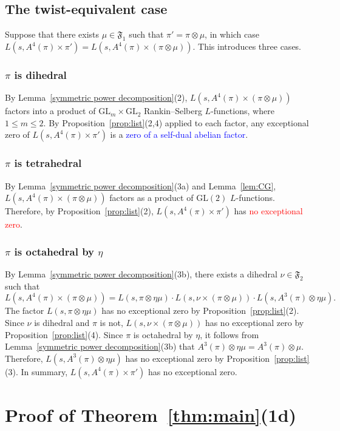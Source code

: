 \documentclass[11pt]{amsart}
\theoremstyle{remark}
\newcommand{\GL}{\mathrm{GL}}
\newcommand{\fF}{\mathfrak{F}}
\numberwithin{equation}{section}
\begin{document}
\subsection{The twist-equivalent case} 
Suppose that there exists $\mu\in\fF_1$ such that $\pi' = \pi \otimes \mu$, in which case $L(s,A^4(\pi) \times \pi') = L(s,A^4(\pi) \times (\pi \otimes \mu))$.  This introduces three cases.
\subsubsection{$\pi$ is dihedral}
By Lemma~\ref{symmetric power decomposition}(2), $L(s,A^4(\pi) \times (\pi \otimes \mu))$ factors into a product of $\GL_m\times \GL_2$ Rankin--Selberg $L$-functions, where $1 \leq m \leq 2$.  By Proposition~\ref{prop:list}(2,4) applied to each factor, any exceptional zero of $L(s,A^4(\pi) \times \pi')$ is a  \textcolor{blue}{zero of a self-dual abelian factor}.
\subsubsection{$\pi$ is tetrahedral}
By Lemma~\ref{symmetric power decomposition}(3a) and Lemma~\ref{lem:CG}, $L(s,A^4(\pi) \times (\pi \otimes \mu))$ factors as a product of $\GL(2)$ $L$-functions.  Therefore, by Proposition~\ref{prop:list}(2), $L(s,A^4(\pi) \times \pi')$ has \textcolor{red}{no exceptional zero}.
\subsubsection{$\pi$ is octahedral by $\eta$}
By Lemma~\ref{symmetric power decomposition}(3b), there exists a dihedral $\nu\in\mathfrak{F}_2$ such that
\[
L(s,A^4(\pi) \times (\pi \otimes \mu)) = L(s,\pi \otimes \eta\mu) \cdot L(s,\nu \times (\pi \otimes \mu)) \cdot L(s,A^3(\pi) \otimes \eta\mu).
\]
The factor $L(s,\pi\otimes\eta\mu)$ has no exceptional zero by Proposition~\ref{prop:list}(2).  Since $\nu$ is dihedral and $\pi$ is not, $L(s,\nu\times(\pi\otimes\mu))$ has no exceptional zero by Proposition~\ref{prop:list}(4).  Since $\pi$ is octahedral by $\eta$, it follows from Lemma~\ref{symmetric power decomposition}(3b) that $A^3(\pi)\otimes\eta\mu=A^3(\pi)\otimes\mu$.  Therefore, $L(s,A^3(\pi) \otimes \eta\mu)$ has no exceptional zero by Proposition~\ref{prop:list}(3).  In summary, $L(s,A^4(\pi) \times \pi')$ has {\color{red}no exceptional zero}.


\section{Proof of Theorem~\ref{thm:main}(1d)}
\label{sec:1d}
\end{document}
